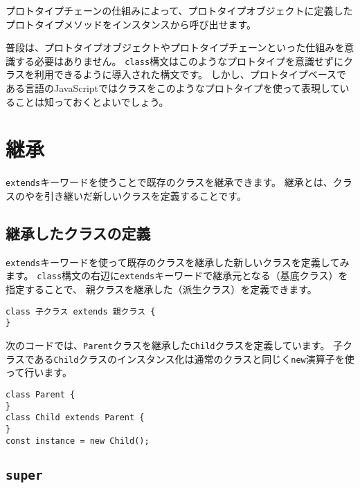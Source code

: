 プロトタイプチェーンの仕組みによって、プロトタイプオブジェクトに定義したプロトタイプメソッドをインスタンスから呼び出せます。

普段は、プロトタイプオブジェクトやプロトタイプチェーンといった仕組みを意識する必要はありません。
\texttt{class}構文はこのようなプロトタイプを意識せずにクラスを利用できるように導入された構文です。
しかし、プロトタイプベースである言語のJavaScriptではクラスをこのようなプロトタイプを使って表現していることは知っておくとよいでしょう。

\hypertarget{extends}{%
\section{継承}\label{extends}}

\texttt{extends}キーワードを使うことで既存のクラスを継承できます。
継承とは、クラスの\textbf{}や\textbf{}を引き継いだ新しいクラスを定義することです。

\hypertarget{class-extends}{%
\subsection{継承したクラスの定義}\label{class-extends}}

\texttt{extends}キーワードを使って既存のクラスを継承した新しいクラスを定義してみます。
\texttt{class}構文の右辺に\texttt{extends}キーワードで継承元となる\textbf{}（基底クラス）を指定することで、
親クラスを継承した\textbf{}（派生クラス）を定義できます。

\begin{lstlisting}
class 子クラス extends 親クラス {
}
\end{lstlisting}

次のコードでは、\texttt{Parent}クラスを継承した\texttt{Child}クラスを定義しています。
子クラスである\texttt{Child}クラスのインスタンス化は通常のクラスと同じく\texttt{new}演算子を使って行います。

\begin{lstlisting}
class Parent {
}
class Child extends Parent {
}
const instance = new Child();
\end{lstlisting}

\hypertarget{class-super}{%
\subsection{\texorpdfstring{\texttt{super}}{super}}\label{class-super}}

